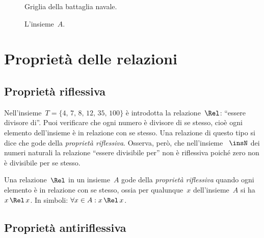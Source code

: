 \ovalbox{\risolvii \ref{ese:\thechapter.12}, \ref{ese:\thechapter.13}, \ref{ese:\thechapter.14}, \ref{ese:\thechapter.15}, \ref{ese:\thechapter.16}, \ref{ese:\thechapter.17}}
\begin{figure}[hb]
\begin{minipage}[t]{.45\textwidth}
 \centering
 
 \caption{Griglia della battaglia navale.}\label{fig:7.1}
\end{minipage}\hfil
\begin{minipage}[t]{.45\textwidth}
 \centering
 
 \caption{L'insieme~$A$.}\label{fig:7.2}
\end{minipage}
\end{figure}

\pagebreak
\section{Proprietà delle relazioni}
\subsection{Proprietà riflessiva}

\begin{exrig}
 \begin{esempio}

Nell'insieme~$T = \{\text{4, 7, 8, 12, 35, 100}\}$ è introdotta la relazione~$\Rel$: ``essere divisore di''.
Puoi verificare che ogni numero è divisore di se stesso, cioè ogni elemento dell'insieme è in relazione
con se stesso. Una relazione di questo tipo si dice che gode della \emph{proprietà riflessiva}.
Osserva, però, che nell'insieme ~$\insN$ dei numeri naturali la relazione ``essere divisibile per'' non è riflessiva poiché zero non è divisibile per se stesso.
 \end{esempio}
\end{exrig}

\begin{definizione}
Una relazione~$\Rel$ in un insieme~$A$ gode della \emph{proprietà riflessiva} quando ogni elemento è in relazione con se stesso, ossia per qualunque~$x$ dell'insieme~$A$ si ha~$x \,\Rel\, x$.
In simboli: $\forall x \in A: x \,\Rel\, x$.
\end{definizione}

\ovalbox{\risolvi \ref{ese:\thechapter.18}}

\subsection{Proprietà antiriflessiva}

